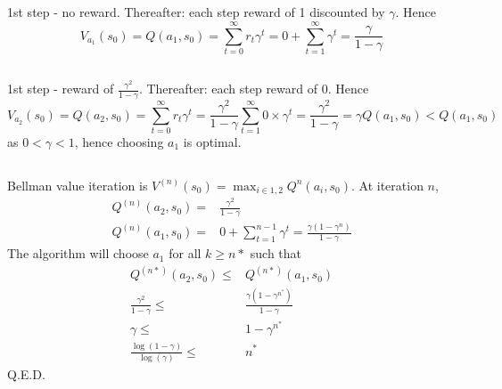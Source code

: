 \section{}\label{question2}

\subsection{}
1st step - no reward.
Thereafter: each step reward of 1 discounted by $\gamma$.
Hence 
\begin{equation*}
V_{a_1}(s_0) = Q(a_1, s_0) = \sum_{t=0}^\infty r_t\gamma^t = 0 + \sum_{t=1}^\infty \gamma^t = \frac{\gamma}{1-\gamma}
\end{equation*}

\subsection{}
1st step - reward of $\frac{\gamma^2}{1-\gamma}$.
Thereafter: each step reward of 0.
Hence 
\begin{equation*}
V_{a_2}(s_0) = Q(a_2, s_0)= \sum_{t=0}^\infty r_t\gamma^t = \frac{\gamma^2}{1-\gamma} \sum_{t=1}^\infty 0\times \gamma^t = \frac{\gamma^2}{1-\gamma} = \gamma Q(a_1, s_0) < Q(a_1, s_0)
\end{equation*}
as $0<\gamma<1$, hence choosing $a_1$ is optimal.

\subsection{}
Bellman value iteration is $V^{(n)}(s_0) = \max_{i\in{1,2}}Q^n (a_i, s_0)$. At iteration $n$, 
\begin{align*}
Q^{(n)}(a_2, s_0) =& \frac{\gamma^2}{1-\gamma} \\
Q^{(n)}(a_1, s_0) =& 0 + \sum_{t=1}^{n-1} \gamma^t = \frac{\gamma (1-\gamma^n) }{1-\gamma} 
\end{align*}
The algorithm will choose $a_1$ for all $k\geq n*$ such that
\begin{align*}
Q^{(n*)}(a_2, s_0) \leq & Q^{(n*)}(a_1, s_0) \\
\frac{\gamma^2}{1-\gamma} \leq & \frac{\gamma (1-\gamma^{n^*}) }{1-\gamma} \\
\gamma \leq&  1-\gamma^{n^*} \\
\frac{\log{(1-\gamma)}}{\log{(\gamma)}} \leq & n^*
\end{align*}
Q.E.D.
